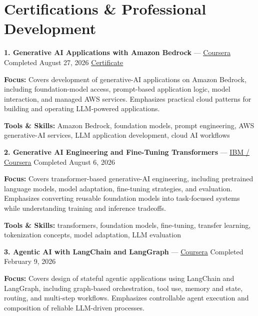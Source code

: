 \documentclass[9pt,letterpaper]{extarticle}
\begin{document}
\section{Certifications \& Professional Development}
\noindent\textbf{1. Generative AI Applications with Amazon Bedrock} {\small --- \textcolor{blue}{\underline{\href{https://www.coursera.org/account/accomplishments/verify/3W16P8EE4BJZ}{Coursera}}} \textbar{} Completed \textbar{} August 27, 2026 \textbar{} \textcolor{blue}{\underline{\href{https://waseemraza844.github.io/portfolio/certificates/genai/aws-bedrock/c2-generative-ai-applications-bedrock.pdf}{Certificate}}}}\par
\textbf{Focus:} Covers development of generative-AI applications on Amazon Bedrock, including foundation-model access, prompt-based application logic, model interaction, and managed AWS services. Emphasizes practical cloud patterns for building and operating LLM-powered applications.\par
{\small\textbf{Tools \& Skills:} Amazon Bedrock, foundation models, prompt engineering, AWS generative-AI services, LLM application development, cloud AI workflows\par}
\vspace{2pt}
\noindent\textbf{2. Generative AI Engineering and Fine-Tuning Transformers} {\small --- \textcolor{blue}{\underline{\href{https://www.coursera.org/account/accomplishments/verify/SG4GDJ4CLPVL}{IBM / Coursera}}} \textbar{} Completed \textbar{} August 6, 2026}\par
\textbf{Focus:} Covers transformer-based generative-AI engineering, including pretrained language models, model adaptation, fine-tuning strategies, and evaluation. Emphasizes converting reusable foundation models into task-focused systems while understanding training and inference tradeoffs.\par
{\small\textbf{Tools \& Skills:} transformers, foundation models, fine-tuning, transfer learning, tokenization concepts, model adaptation, LLM evaluation\par}
\vspace{2pt}
\noindent\textbf{3. Agentic AI with LangChain and LangGraph} {\small --- \textcolor{blue}{\underline{\href{https://www.coursera.org/account/accomplishments/verify/L4EY4SLGCPUE}{Coursera}}} \textbar{} Completed \textbar{} February 9, 2026}\par
\textbf{Focus:} Covers design of stateful agentic applications using LangChain and LangGraph, including graph-based orchestration, tool use, memory and state, routing, and multi-step workflows. Emphasizes controllable agent execution and composition of reliable LLM-driven processes.\par
\end{document}
